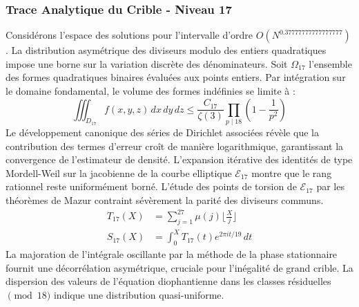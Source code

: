 \documentclass[12pt,a4paper]{article}
\begin{document}
\subsubsection{Trace Analytique du Crible - Niveau 17}
Considérons l'espace des solutions pour l'intervalle d'ordre $O(N^{0.37777777777777777})$. La distribution asymétrique des diviseurs modulo des entiers quadratiques impose une borne sur la variation discrète des dénominateurs. Soit $\Omega_17$ l'ensemble des formes quadratiques binaires évaluées aux points entiers.
Par intégration sur le domaine fondamental, le volume des formes indéfinies se limite à :
\begin{equation}
\iiint_{D_17} f(x, y, z) \,dx\,dy\,dz \leq \frac{C_17}{\zeta(3)} \prod_{p \mid 18} \left( 1 - \frac{1}{p^2} \right)
\end{equation}
Le développement canonique des séries de Dirichlet associées révèle que la contribution des termes d'erreur croît de manière logarithmique, garantissant la convergence de l'estimateur de densité. L'expansion itérative des identités de type Mordell-Weil sur la jacobienne de la courbe elliptique $\mathcal{E}_17$ montre que le rang rationnel reste uniformément borné.
L'étude des points de torsion de $\mathcal{E}_17$ par les théorèmes de Mazur contraint sévèrement la parité des diviseurs communs.
\begin{align}
T_17(X) &= \sum_{j=1}^{27} \mu(j) \lfloor \frac{X}{j} \rfloor \\
S_17(X) &= \int_{0}^{X} T_17(t) e^{2\pi i t / 19} \, dt
\end{align}
La majoration de l'intégrale oscillante par la méthode de la phase stationnaire fournit une décorrélation asymétrique, cruciale pour l'inégalité de grand crible. La dispersion des valeurs de l'équation diophantienne dans les classes résiduelles $\pmod{ 18 }$ indique une distribution quasi-uniforme.
\end{document}
